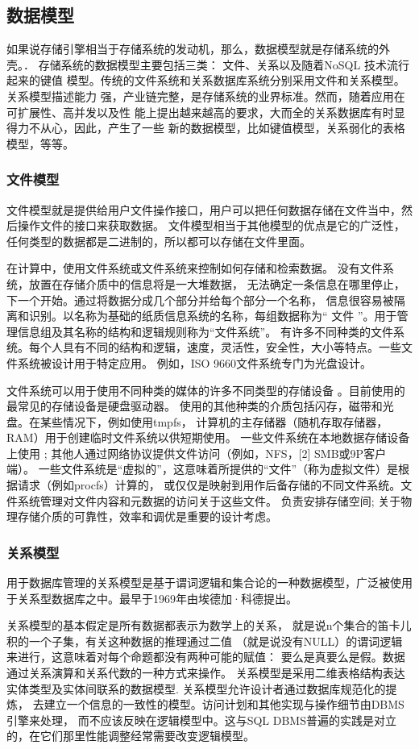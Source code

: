 \subsection{数据模型}
如果说存储引擎相当于存储系统的发动机，那么，数据模型就是存储系统的外壳。．
存储系统的数据模型主要包括三类： 文件、关系以及随着NoSQL 技术流行起来的键值
模型。传统的文件系统和关系数据库系统分别采用文件和关系模型。关系模型描述能力
强，产业链完整，是存储系统的业界标准。然而，随着应用在可扩展性、高并发以及性
能上提出越来越高的要求，大而全的关系数据库有时显得力不从心，因此，产生了一些
新的数据模型，比如键值模型，关系弱化的表格模型，等等。
\subsubsection{文件模型}
文件模型就是提供给用户文件操作接口，用户可以把任何数据存储在文件当中，然后操作文件的接口来获取数据。
文件模型相当于其他模型的优点是它的广泛性，任何类型的数据都是二进制的，所以都可以存储在文件里面。

在计算中，使用文件系统或文件系统来控制如何存储和检索数据。
没有文件系统，放置在存储介质中的信息将是一大堆数据，
无法确定一条信息在哪里停止，下一个开始。通过将数据分成几个部分并给每个部分一个名称，
信息很容易被隔离和识别。以名称为基础的纸质信息系统的名称，每组数据称为“ 文件 ”。用于管理信息组及其名称的结构和逻辑规则称为“文件系统”。
有许多不同种类的文件系统。每个人具有不同的结构和逻辑，速度，灵活性，安全性，大小等特点。一些文件系统被设计用于特定应用。
例如，ISO 9660文件系统专门为光盘设计。

文件系统可以用于使用不同种类的媒体的许多不同类型的存储设备
。目前使用的最常见的存储设备是硬盘驱动器。
使用的其他种类的介质包括闪存，磁带和光盘。在某些情况下，例如使用tmpfs，
计算机的主存储器（随机存取存储器，RAM）用于创建临时文件系统以供短期使用。
一些文件系统在本地数据存储设备上使用 ; 其他人通过网络协议提供文件访问（例如，NFS，[2] SMB或9P客户端）。
一些文件系统是“虚拟的”，这意味着所提供的“文件”（称为虚拟文件）是根据请求（例如procfs）计算的，
或仅仅是映射到用作后备存储的不同文件系统。文件系统管理对文件内容和元数据的访问关于这些文件。
负责安排存储空间; 关于物理存储介质的可靠性，效率和调优是重要的设计考虑。
\subsubsection{关系模型}
用于数据库管理的关系模型是基于谓词逻辑和集合论的一种数据模型，广泛被使用于关系型数据库之中。最早于1969年由埃德加·科德提出。

关系模型的基本假定是所有数据都表示为数学上的关系，
就是说n个集合的笛卡儿积的一个子集，有关这种数据的推理通过二值
（就是说没有NULL）的谓词逻辑来进行，这意味着对每个命题都没有两种可能的赋值：
要么是真要么是假。数据通过关系演算和关系代数的一种方式来操作。
关系模型是采用二维表格结构表达实体类型及实体间联系的数据模型.
关系模型允许设计者通过数据库规范化的提炼，
去建立一个信息的一致性的模型。访问计划和其他实现与操作细节由DBMS引擎来处理，
而不应该反映在逻辑模型中。这与SQL DBMS普遍的实践是对立的，在它们那里性能调整经常需要改变逻辑模型。

